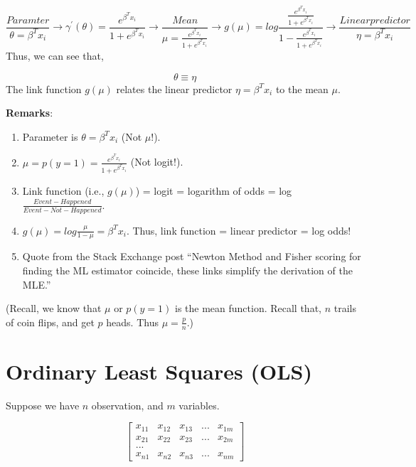 \documentclass[]{book}
\begin{document}
\[ \frac{Paramter}{\theta=\beta^Tx_i}  \longrightarrow \gamma^{'}(\theta)= \frac{e^{\beta^Tx_i}}{1+e^{\beta^Tx_i}}\longrightarrow \frac{Mean}{\mu=\frac{e^{\beta^Tx_i}}{1+e^{\beta^Tx_i}}}\longrightarrow g(\mu) = log \frac{\frac{e^{\beta^Tx_i}}{1+e^{\beta^Tx_i}}}{1-\frac{e^{\beta^Tx_i}}{1+e^{\beta^Tx_i}}}\longrightarrow \frac{ Linear predictor}{\eta = \beta^Tx_i}\]
Thus, we can see that,

\[\theta \equiv \eta \]
The link function \(g(\mu)\) relates the linear predictor \(\eta = \beta^Tx_i\) to the mean \(\mu\).

\textbf{Remarks}:

\begin{enumerate}
\def\labelenumi{(\arabic{enumi})}
\item
  Parameter is \(\theta = \beta ^T x_i\) (Not \(\mu\)!).
\item
  \(\mu=p(y=1)=\frac{e^{\beta^Tx_i}}{1+e^{\beta^Tx_i}}\) (Not logit!).
\item
  Link function (i.e., \(g(\mu)\)) = logit = logarithm of odds = log \(\frac{Event - Happened }{Event - Not - Happened}\).
\item
  \(g(\mu) = log \frac{\mu}{1-\mu}=\beta^T x_i\). Thus, link function = linear predictor = log odds!
\item
  Quote from the Stack Exchange post ``Newton Method and Fisher scoring for finding the ML estimator coincide, these links simplify the derivation of the MLE.''
\end{enumerate}

(Recall, we know that \(\mu\) or \(p(y=1)\) is the mean function. Recall that, \(n\) trails of coin flips, and get \(p\) heads. Thus \(\mu = \frac{p}{n}\).)

\hypertarget{ordinary-least-squares-ols}{%
\section{Ordinary Least Squares (OLS)}\label{ordinary-least-squares-ols}}

Suppose we have \(n\) observation, and \(m\) variables.

\[\begin{bmatrix}
x_{11} & x_{12} & x_{13} & ... & x_{1m}\\
x_{21} & x_{22} & x_{23} & ... & x_{2m} \\
...\\
x_{n1} & x_{n2} & x_{n3} & ... & x_{nm}
\end{bmatrix}\]
\end{document}
